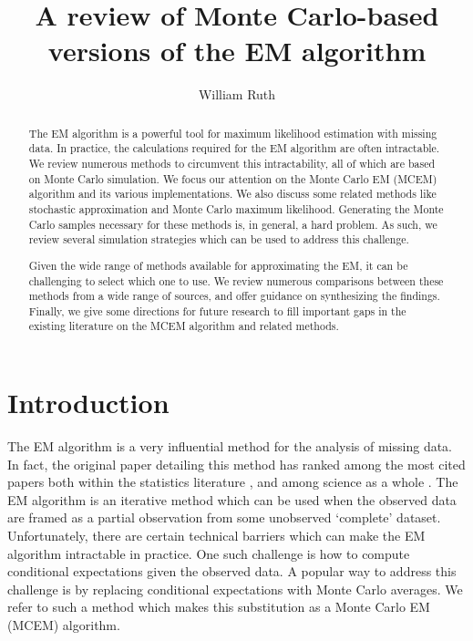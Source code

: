 \documentclass[11pt, oneside]{article}   	%
\title{A review of Monte Carlo-based versions of the EM algorithm}
\author[1]{William Ruth}
\affil[1]{Corresponding Author - Department of Statistics and Actuarial Science \\ Simon Fraser University \\ Burnaby, BC  Canada \\ wruth@sfu.ca}
\date{}
\begin{document}
\maketitle


\begin{abstract}
    The EM algorithm is a powerful tool for maximum likelihood estimation with missing data. In practice, the calculations required for the EM algorithm are often intractable. We review numerous methods to circumvent this intractability, all of which are based on Monte Carlo simulation. We focus our attention on the Monte Carlo EM (MCEM) algorithm and its various implementations. We also discuss some related methods like stochastic approximation and Monte Carlo maximum likelihood. Generating the Monte Carlo samples necessary for these methods is, in general, a hard problem. As such, we review several simulation strategies which can be used to address this challenge.

    Given the wide range of methods available for approximating the EM, it can be challenging to select which one to use. We review numerous comparisons between these methods from a wide range of sources, and offer guidance on synthesizing the findings. Finally, we give some directions for future research to fill important gaps in the existing literature on the MCEM algorithm and related methods.
\end{abstract}

\section{Introduction}

The EM algorithm \citep{Dem77} is a very influential method for the analysis of missing data. In fact, the original paper detailing this method has ranked among the most cited papers both within the statistics literature \citep{Rya05}, and among science as a whole \citep{Van14}. The EM algorithm is an iterative method which can be used when the observed data are framed as a partial observation from some unobserved `complete' dataset. Unfortunately, there are certain technical barriers which can make the EM algorithm intractable in practice. One such challenge is how to compute conditional expectations given the observed data. A popular way to address this challenge is by replacing conditional expectations with Monte Carlo averages. We refer to such a method which makes this substitution as a Monte Carlo EM (MCEM) algorithm.
\end{document}
